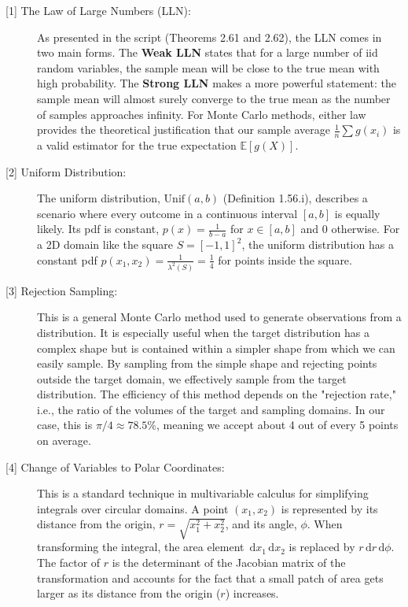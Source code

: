 \documentclass[11pt,a4paper]{article}
\newcommand{\E}{\mathbb{E}}
\newcommand{\dd}{\,\mathrm{d}}
\begin{document}
\begin{description}
    \item[\hypertarget{note1}{[1] The Law of Large Numbers (LLN):}] As presented in the script (Theorems 2.61 and 2.62), the LLN comes in two main forms. The \textbf{Weak LLN} states that for a large number of iid random variables, the sample mean will be close to the true mean with high probability. The \textbf{Strong LLN} makes a more powerful statement: the sample mean will almost surely converge to the true mean as the number of samples approaches infinity. For Monte Carlo methods, either law provides the theoretical justification that our sample average $\frac{1}{n} \sum g(x_i)$ is a valid estimator for the true expectation $\E[g(X)]$.

    \item[\hypertarget{note2}{[2] Uniform Distribution:}] The uniform distribution, $\text{Unif}(a,b)$ (Definition 1.56.i), describes a scenario where every outcome in a continuous interval $[a,b]$ is equally likely. Its pdf is constant, $p(x) = \frac{1}{b-a}$ for $x \in [a,b]$ and $0$ otherwise. For a 2D domain like the square $S=[-1,1]^2$, the uniform distribution has a constant pdf $p(x_1, x_2) = \frac{1}{\lambda^2(S)} = \frac{1}{4}$ for points inside the square.

    \item[\hypertarget{note3}{[3] Rejection Sampling:}] This is a general Monte Carlo method used to generate observations from a distribution. It is especially useful when the target distribution has a complex shape but is contained within a simpler shape from which we can easily sample. By sampling from the simple shape and rejecting points outside the target domain, we effectively sample from the target distribution. The efficiency of this method depends on the "rejection rate," i.e., the ratio of the volumes of the target and sampling domains. In our case, this is $\pi/4 \approx 78.5\%$, meaning we accept about 4 out of every 5 points on average.

    \item[\hypertarget{note4}{[4] Change of Variables to Polar Coordinates:}] This is a standard technique in multivariable calculus for simplifying integrals over circular domains. A point $(x_1, x_2)$ is represented by its distance from the origin, $r = \sqrt{x_1^2 + x_2^2}$, and its angle, $\phi$. When transforming the integral, the area element $\dd x_1 \dd x_2$ is replaced by $r \dd r \dd\phi$. The factor of $r$ is the determinant of the Jacobian matrix of the transformation and accounts for the fact that a small patch of area gets larger as its distance from the origin ($r$) increases.

\end{description}
\end{document}

